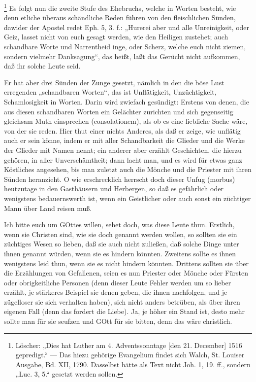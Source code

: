 \footnote{Löscher: „Dies hat Luther am 4. Adventssonntage [den 21. December] 1516 gepredigt.“ — Das hiezu gehörige Evangelium findet sich Walch, St. Louiser Ausgabe, Bd. XII, 1790. Dasselbst hätte als Text nicht Joh. 1, 19. ff., sondern „Luc. 3, 5.“ gesetzt werden sollen.} Es folgt nun die zweite Stufe des Ehebruchs, welche in Worten besteht, wie denn etliche überaus schändliche Reden führen von den fleischlichen Sünden, dawider der Apostel redet Eph. 5, 3. f.: „Hurerei aber und alle Unreinigkeit, oder Geiz, lasset nicht von euch gesagt werden, wie den Heiligen zustehet; auch schandbare Worte und Narrentheid inge, oder Scherz, welche euch nicht ziemen, sondern vielmehr Danksagung“, das heißt, laßt das Gerücht nicht aufkommen, daß ihr solche Leute seid.

Er hat aber drei Sünden der Zunge gesetzt, nämlich in den die böse Lust erregenden „schandbaren Worten“, das ist Unflätigkeit, Unzüchtigkeit, Schamlosigkeit in Worten. Darin wird zwiefach gesündigt: Erstens von denen, die aus diesen schandbaren Worten ein Gelächter zurichten und sich
gegenseitig gleichsam Muth einsprechen (consolationem), als ob es eine liebliche Sache wäre, von der sie reden. Hier thut einer nichts Anderes, als daß er zeige, wie unflätig auch er sein könne, indem er mit aller Schandbarkeit die Glieder und die Werke der Glieder mit Namen nennt; ein anderer aber erzählt Geschichten, die hierzu gehören, in aller Unverschämtheit; dann lacht man, und es wird für etwas ganz Köstliches angesehen, bis man zuletzt auch die Mönche und die Priester mit ihren Sünden heranzieht. O wie erschrecklich herrscht doch dieser Unfug (morbus) heutzutage in den Gasthäusern und Herbergen, so daß es gefährlich oder wenigstens bedauernswerth ist, wenn ein Geistlicher oder auch sonst ein züchtiger Mann über Land reisen muß.

Ich bitte euch um GOttes willen, sehet doch, was diese Leute thun. Erstlich, wenn sie Christen sind, wie sie doch genannt werden wollen, so sollten sie ein züchtiges Wesen so lieben, daß sie auch nicht zuließen, daß solche Dinge unter ihnen genannt würden, wenn sie es hindern könnten. Zweitens sollte es ihnen wenigstens leid thun, wenn sie es nicht hindern könnten. Drittens sollten sie über die Erzählungen von Gefallenen, seien es nun Priester oder Mönche oder Fürsten oder obrigkeitliche Personen (denn dieser Leute Fehler werden um so lieber erzählt, je stärkeres Beispiel sie denen geben, die ihnen nachfolgen, und je zügelloser sie sich verhalten haben), sich nicht anders betrüben, als über ihren eigenen Fall (denn das fordert die Liebe). Ja, je höher ein Stand ist, desto mehr sollte man für sie seufzen und GOtt für sie bitten, denn das wäre christlich.

